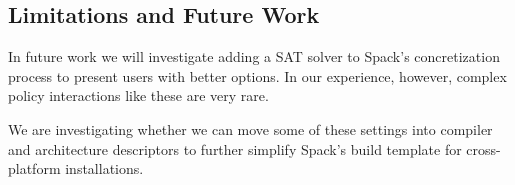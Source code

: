 
\subsection{Limitations and Future Work}

In future work we will investigate adding a SAT solver to Spack's
concretization process to present users with better options.  In our
experience, however, complex policy interactions like these are very
rare.

We are investigating whether we can move some of these settings into compiler and
architecture descriptors to further simplify Spack's build template for cross-platform
installations.
